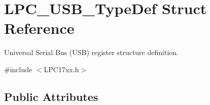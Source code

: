 \hypertarget{struct_l_p_c___u_s_b___type_def}{\section{\-L\-P\-C\-\_\-\-U\-S\-B\-\_\-\-Type\-Def \-Struct \-Reference}
\label{struct_l_p_c___u_s_b___type_def}
}


\-Universal \-Serial \-Bus (\-U\-S\-B) register structure definition.  




{\ttfamily \#include $<$\-L\-P\-C17xx.\-h$>$}

\subsection*{\-Public \-Attributes}

